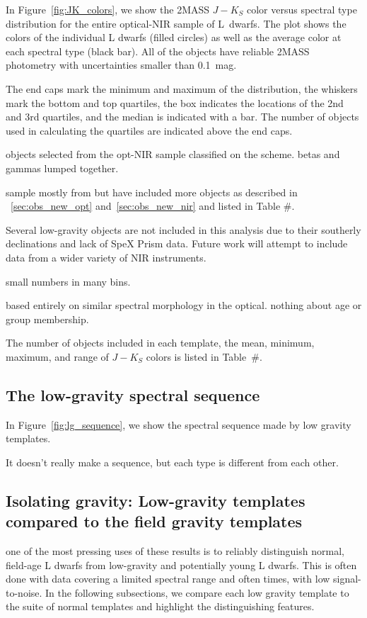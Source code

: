 \documentclass[12pt,preprint]{aastex}
\begin{document}
In Figure~\ref{fig:JK_colors}, we show the 2MASS $J-K_S$ color versus spectral type distribution for the entire optical-NIR sample of L~dwarfs. The plot shows the colors of the individual L dwarfs (filled circles) as well as the average color at each spectral type (black bar). All of the objects have reliable 2MASS photometry with uncertainties smaller than 0.1~mag. 

The end caps mark the minimum and maximum of the distribution, the whiskers mark the bottom and top quartiles, the box indicates the locations of the 2nd and 3rd quartiles, and the median is indicated with a bar. The number of objects used in calculating the quartiles are indicated above the end caps.

objects selected from the opt-NIR sample classified on the \citet{Cruz09_lowg} scheme. betas and gammas lumped together.

sample mostly from \citet{Cruz09_lowg} but have included more objects as described in \SS~\ref{sec:obs_new_opt} and~\ref{sec:obs_new_nir} and listed in Table \#.

Several low-gravity objects are not included in this analysis due to their southerly declinations and lack of SpeX Prism data. Future work will attempt to include data from a wider variety of NIR instruments.

small numbers in many bins.

based entirely on similar spectral morphology in the optical. nothing about age or group membership.

The number of objects included in each template, the mean, minimum, maximum, and range of $J-K_S$ colors is listed in Table~\#. 

\subsection{The low-gravity spectral sequence}

In Figure~\ref{fig:lg_sequence}, we show the spectral sequence made by low gravity templates.

It doesn't really make a sequence, but each type is different from each other.

\subsection{Isolating gravity: Low-gravity templates compared to the field gravity templates} 

one of the most pressing uses of these results is to reliably distinguish normal, field-age L dwarfs from low-gravity and potentially young L dwarfs. This is often done with data covering a limited spectral range and often times, with low signal-to-noise. In the following subsections, we compare each low gravity template to the suite of normal templates and highlight the distinguishing features.
\end{document}
